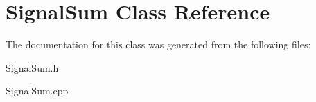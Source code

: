 \hypertarget{classSignalSum}{}\section{Signal\+Sum Class Reference}
\label{classSignalSum}


The documentation for this class was generated from the following files\+:\begin{DoxyCompactItemize}
\item 
Signal\+Sum.\+h\item 
Signal\+Sum.\+cpp\end{DoxyCompactItemize}
